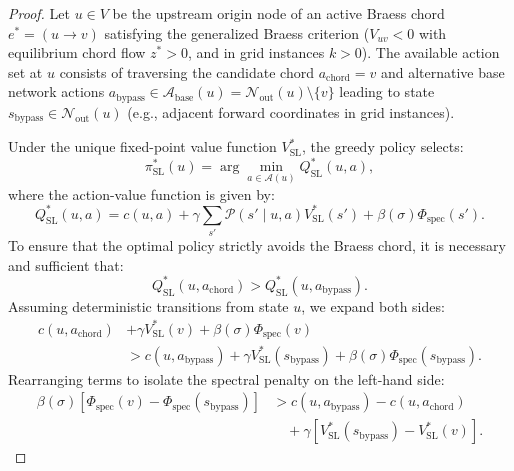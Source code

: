 \documentclass[11pt,a4paper]{article}
\begin{document}
\begin{proof}
Let $u \in V$ be the upstream origin node of an active Braess chord $e^* = (u \to v)$ satisfying the generalized Braess criterion ($V_{uv} < 0$ with equilibrium chord flow $z^* > 0$, and in grid instances $k > 0$). The available action set at $u$ consists of traversing the candidate chord $a_{\text{chord}} = v$ and alternative base network actions $a_{\text{bypass}} \in \mathcal{A}_{\text{base}}(u) = \mathcal{N}_{\text{out}}(u) \setminus \{v\}$ leading to state $s_{\text{bypass}} \in \mathcal{N}_{\text{out}}(u)$ (e.g., adjacent forward coordinates in grid instances).

Under the unique fixed-point value function $V_{\text{SL}}^*$, the greedy policy selects:
\begin{equation}
\pi_{\text{SL}}^*(u) = \arg\min_{a \in \mathcal{A}(u)} Q_{\text{SL}}^*(u, a),
\end{equation}
where the action-value function is given by:
\begin{equation}
Q_{\text{SL}}^*(u, a) = c(u, a) + \gamma \sum_{s'} \mathcal{P}(s' \mid u, a) V_{\text{SL}}^*(s') + \beta(\sigma) \Phi_{\text{spec}}(s').
\end{equation}
To ensure that the optimal policy strictly avoids the Braess chord, it is necessary and sufficient that:
\begin{equation}
Q_{\text{SL}}^*(u, a_{\text{chord}}) > Q_{\text{SL}}^*(u, a_{\text{bypass}}).
\end{equation}
Assuming deterministic transitions from state $u$, we expand both sides:
\begin{equation}
\begin{split}
c(u, a_{\text{chord}}) &+ \gamma V_{\text{SL}}^*(v) + \beta(\sigma) \Phi_{\text{spec}}(v) \\
&> c(u, a_{\text{bypass}}) + \gamma V_{\text{SL}}^*(s_{\text{bypass}}) + \beta(\sigma) \Phi_{\text{spec}}(s_{\text{bypass}}).
\end{split}
\end{equation}
Rearranging terms to isolate the spectral penalty on the left-hand side:
\begin{equation}
\begin{split}
\beta(\sigma) \left[ \Phi_{\text{spec}}(v) - \Phi_{\text{spec}}(s_{\text{bypass}}) \right] &> c(u, a_{\text{bypass}}) - c(u, a_{\text{chord}}) \\
&\quad + \gamma \left[ V_{\text{SL}}^*(s_{\text{bypass}}) - V_{\text{SL}}^*(v) \right].
\end{split}
\end{equation}

\end{proof}
\end{document}
